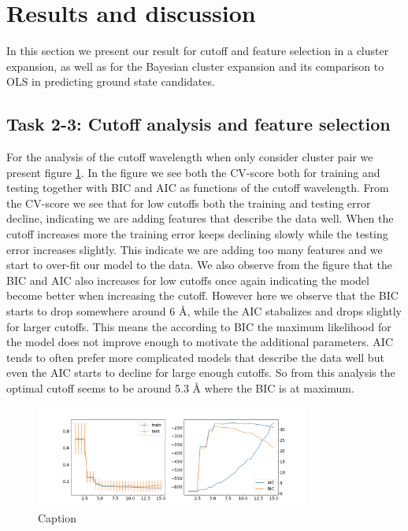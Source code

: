 \documentclass[11pt,a4paper]{article}
\begin{document}
\section{Results and discussion}

In this section we present our result for cutoff and feature selection in a cluster expansion, as well as for the Bayesian cluster expansion and its comparison to OLS in predicting ground state candidates. 

\subsection[Task 1]{Task 2-3: Cutoff analysis and feature selection}
For the analysis of the cutoff wavelength when only consider cluster pair we present figure \ref{fig:cutoff_scan}. In the figure we see both the CV-score both for training and testing together with BIC and AIC as functions of the cutoff wavelength. From the CV-score we see that for low cutoffs both the training and testing error decline, indicating we are adding features that describe the data well. When the cutoff increases more the training error keeps declining slowly while the testing error increases slightly. This indicate we are adding too many features and we start to over-fit our model to the data. We also observe from the figure that the BIC and AIC also increases for low cutoffs once again indicating the model become better when increasing the  cutoff. However here we observe that the BIC starts to drop somewhere around 6 Å, while the AIC stabalizes and drops slightly for larger cutoffs. This means the according to BIC the maximum likelihood for the model does not improve enough to motivate the additional parameters. AIC tends to often prefer more complicated models that describe the data well but even the AIC starts to decline for large enough cutoffs. So from this analysis the optimal cutoff seems to be around 5.3 Å where the BIC is at maximum. 

\begin{figure}[H]
    \centering
    \includegraphics[width = 0.8\textwidth]{figures/cutoff_scan.png}
    \caption{Caption}
    \label{fig:cutoff_scan}
\end{figure}
\end{document}
